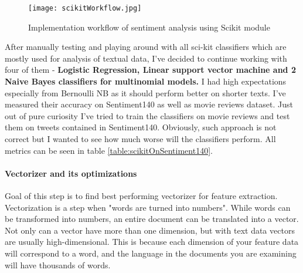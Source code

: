 \begin{figure}[H]%
    \centering
	\texttt{[image: scikitWorkflow.jpg]}
    \caption{Implementation workflow of sentiment analysis using Scikit module}%
    \label{fig:scikitWorkflow}%
\end{figure}

After manually testing and playing around with all sci-kit classifiers which are mostly used for analysis of textual data, I've decided to continue working with four of them - \textbf{Logistic Regression, Linear support vector machine and 2 Naive Bayes classifiers for multinomial models.} I had high expectations especially from Bernoulli NB as it should perform better on shorter texts. I've measured their accuracy on Sentiment140 as well as movie reviews dataset. Just out of pure curiosity I've tried to train the classifiers on movie reviews and test them on tweets contained in Sentiment140. Obviously, such approach is not correct but I wanted to see how much worse will the classifiers perform. All metrics can be seen in table \ref{table:scikitOnSentiment140}.

\paragraph{Vectorizer and its optimizations}
Goal of this step is to find best performing vectorizer for feature extraction.	Vectorization is a step when "words are turned into numbers". While words can be transformed into numbers, an entire document can be translated into a vector. Not only can a vector have more than one dimension, but with text data vectors are usually high-dimensional. This is because each dimension of your feature data will correspond to a word, and the language in the documents you are examining will have thousands of words.

